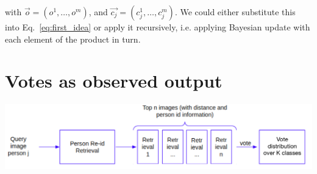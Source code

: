 \documentclass[10pt,a4paper,final]{article}
\begin{document}
\noindent with $\overrightarrow{o} = (o^1, \ldots, o^{m})$, and $\overrightarrow{c_j} = (c^1_{j}, \ldots, c^m_{j})$. We could either substitute this into Eq.~\ref{eq:first_idea} or apply it recursively, i.e. applying Bayesian update with each element of the product in turn.%

\section{Votes as observed output}

\includegraphics[width=\textwidth]{figures/second_idea_new.png}
\end{document}
